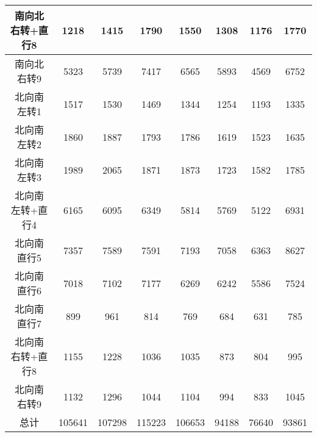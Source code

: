 \documentclass[UTF8]{article}
\begin{document}
\begin{table}[h]
\begin{tabular}{cccccccc}
            \hline
            南向北右转+直行8	&1218	&1415	&1790	&1550	&1308	&1176	&1770\\
            \hline            
            南向北右转9	&5323	&5739	&7417	&6565	&5893	&4569	&6752\\
            \hline
            北向南左转1	&1517	&1530	&1469	&1344	&1254	&1193	&1335\\
            \hline
            北向南左转2	&1860	&1887	&1793	&1786	&1619	&1523	&1635\\
            \hline
            北向南左转3	&1989	&2065	&1871	&1873	&1723	&1582	&1785\\
            \hline
            北向南左转+直行4	&6165	&6095	&6349	&5814	&5769	&5122	&6931\\
            \hline
            北向南直行5	&7357	&7589	&7591	&7193	&7058	&6363	&8627\\
            \hline
            北向南直行6	&7018	&7102	&7177	&6269	&6242	&5586	&7524\\
            \hline
            北向南直行7	&899	&961	&814	&769	&684	&631	&785\\
            \hline
            北向南右转+直行8	&1155	&1228	&1036	&1035	&873	&804	&995\\
            \hline
            北向南右转9	&1132	&1296	&1044	&1104	&994	&833	&1045\\
            \hline
            总计	&105641	&107298	&115223	&106653	&94188	&76640	&93861\\
            
        \end{tabular}
    \end{table}

    
\end{document}
